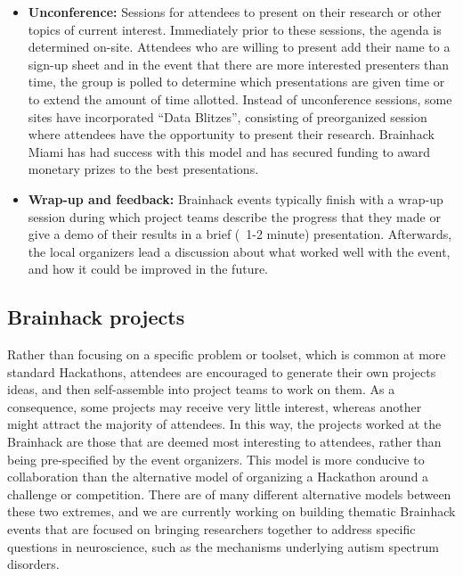 \documentclass[11pt]{bmc_article_s50}
\begin{document}
\begin{itemize}
\item
  \textbf{Unconference:} Sessions for attendees to present on their research or other topics of current interest. Immediately prior to these sessions, the agenda is determined on-site. Attendees who are willing to present add their name to a sign-up sheet and in the event that there are more interested presenters than time, the group is polled to determine which presentations are given time or to extend the amount of time allotted. Instead of unconference sessions, some sites have incorporated ``Data Blitzes'', consisting of preorganized session where attendees have the opportunity to present their research. Brainhack Miami has had success with this model and has secured funding to award monetary prizes to the best presentations.
\item
  \textbf{Wrap-up and feedback:} Brainhack events typically finish with a wrap-up session during which project teams describe the progress that they made or give a demo of their results in a brief (~1-2 minute) presentation. Afterwards, the local organizers lead a discussion about what worked well with the event, and how it could be improved in the future.
\end{itemize}

\subsection{Brainhack projects}\label{project-examples}

Rather than focusing on a specific problem or toolset, which is common at more standard Hackathons, attendees are encouraged to generate their own projects ideas, and then self-assemble into project teams to work on them. As a consequence, some projects may receive very little interest, whereas another might attract the majority of attendees. In this way, the projects worked at the Brainhack are those that are deemed most interesting to attendees, rather than being pre-specified by the event organizers. This model is more conducive to collaboration than the alternative model of organizing a Hackathon around a challenge or competition. There are of many different alternative models between these two extremes, and we are currently working on building thematic Brainhack events that are focused on bringing researchers together to address specific questions in neuroscience, such as the mechanisms underlying autism spectrum disorders.  
\end{document}
